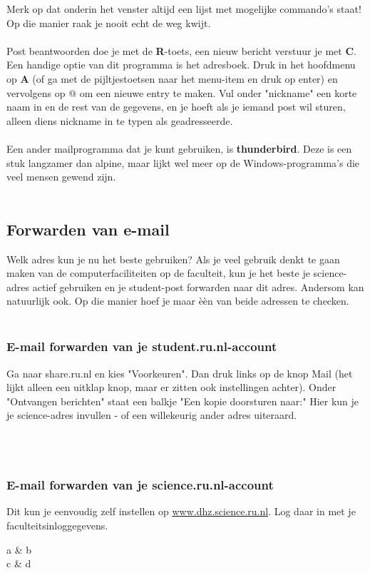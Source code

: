 Merk op dat onderin het venster altijd een lijst met mogelijke commando's staat! Op die manier raak je nooit echt de weg kwijt.
\\
\\
Post beantwoorden doe je met de \textbf{R}-toets, een nieuw bericht verstuur je met \textbf{C}. Een handige optie van dit programma is het adresboek. Druk in het hoofdmenu op \textbf{A} (of ga met de pijltjestoetsen naar het menu-item en druk op enter) en vervolgens op @ om een nieuwe entry te maken. Vul onder "nickname" een korte naam in en de rest van de gegevens, en je hoeft als je iemand post wil sturen, alleen diens nickname in te typen als geadresseerde.
\\
\\

Een ander mailprogramma dat je kunt gebruiken, is \textbf{thunderbird}. Deze is een stuk langzamer dan alpine, maar lijkt wel meer op de Windows-programma's die veel mensen gewend zijn. 
\\
\\
\subsection{Forwarden van e-mail}

Welk adres kun je nu het beste gebruiken? Als je veel gebruik denkt te gaan maken van de computerfaciliteiten op de faculteit, kun je het beste je science-adres actief gebruiken en je student-post forwarden naar dit adres. Andersom kan natuurlijk ook. Op die manier hoef je maar \`e\`en van beide adressen te checken. 
\\
\\
\subsubsection{E-mail forwarden van je student.ru.nl-account}

Ga naar share.ru.nl en kies "Voorkeuren". Dan druk links op de knop Mail (het lijkt alleen een uitklap knop, maar er zitten ook instellingen achter). Onder "Ontvangen berichten" staat een balkje "Een kopie doorsturen naar:" Hier kun je je science-adres invullen - of een willekeurig ander adres uiteraard. 

\\
\\
\subsubsection{E-mail forwarden van je science.ru.nl-account}

Dit kun je eenvoudig zelf instellen op \href{www.dhz.science.ru.nl}{www.dhz.science.ru.nl}. Log daar in met je faculteitsinloggegevens.

\begin{tabular}[|c||c|]
\hline
a & b \\
c & d \\
\hline \hline
\end{tabular}